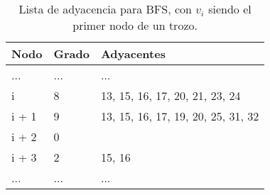  \begin{table}%
\caption{Lista de adyacencia para BFS, con $v_{i}$ siendo el primer nodo de un trozo.}
\label{table:bfs-adjacency}
\centering
\footnotesize

\begin{tabular}{|l|l|l|}
	\toprule
	Nodo & Grado & Adyacentes \\
	\midrule
	... & ... & ... \\
	i & 8 & 13, 15, 16, 17, 20, 21, 23, 24 \\
	i + 1 & 9 & 13, 15, 16, 17, 19, 20, 25, 31, 32 \\
	i + 2 & 0 &  \\
	i + 3 & 2 & 15, 16 \\
	... & ... & ... \\
\end{tabular}
\end{table} 
